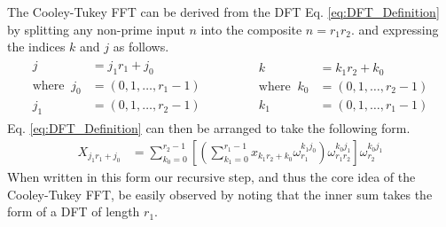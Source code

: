 The Cooley-Tukey FFT can be derived from the DFT Eq. \ref{eq:DFT_Definition} by splitting any non-prime input $n$ into the composite $n=r_1r_2$. and expressing the indices $k$ and $j$ as follows.
\begin{align}\label{eq:IndexManipulation}
    \begin{aligned}
        j&=j_1r_1+j_0 \\
        \text{where }~
        j_0&=(0,1,\dots,r_1-1) \\
        j_1&=(0,1,\dots,r_2-1) 
    \end{aligned}
    \begin{aligned}
        &~&~&~
    \end{aligned}
    \begin{aligned}
        k&=k_1r_2+k_0 \\
        \text{where }~k_0&=(0,1,\dots,r_2-1) \\
        k_1&=(0,1,\dots,r_1-1)
    \end{aligned}
\end{align}
Eq. \ref{eq:DFT_Definition} can then be arranged to take the following form.
\begin{align}
    X_{j_1r_1+j_0}&=\sum^{r_2-1}_{k_0=0}\left[\left(\sum^{r_1-1}_{k_1=0}x_{k_1r_2+k_0}\omega_{r_1}^{k_1j_0}\right)\omega_{r_1r_2}^{k_0j_1}\right]\omega_{r_2}^{k_0j_1}
    \label{eq:FFTDefinitionFromDFT}
\end{align}
When written in this form our recursive step, and thus the core idea of the Cooley-Tukey FFT, be easily observed by noting that the inner sum takes the form of a DFT of length $r_1$.


%



